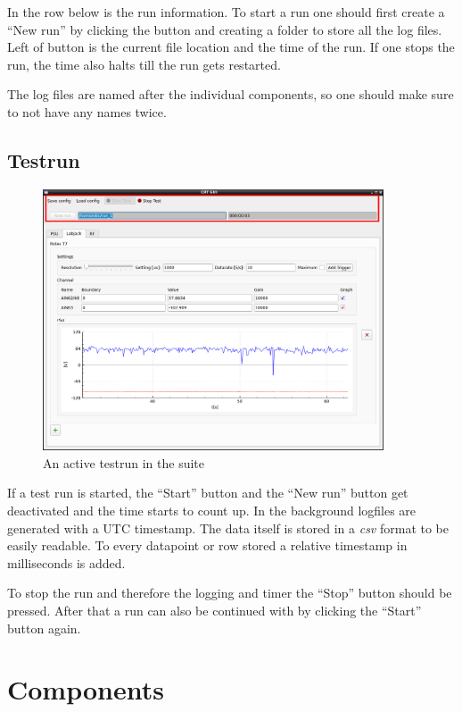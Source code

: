 \documentclass[10pt,a4paper]{article}
\begin{document}
	In the row below is the run information. To start a run one should first create a \enquote{New run} by clicking the button and creating a folder to store all the log files. Left of button is the current file location and the time of the run. If one stops the run, the time also halts till the run gets restarted. 
	
	The log files are named after the individual components, so one should make sure to not have any names twice.
	
	\subsection{Testrun}	
	
	\begin{figure}[H]
	\centering
	\includegraphics[width=0.9\textwidth]{./4_Testrun.png}
	\caption{An active testrun in the suite}
	\end{figure}
	
	If a test run is started, the \enquote{Start} button and the \enquote{New run} button get deactivated and the time starts to count up. In the background logfiles are generated with a UTC timestamp. The data itself is stored in a \textit{csv} format to be easily readable. To every datapoint or row stored a relative timestamp in milliseconds is added.
	
	To stop the run and therefore the logging and timer the \enquote{Stop} button should be pressed. After that a run can also be continued with by clicking the \enquote{Start} button again.	
	
\section{Components}
\end{document}
